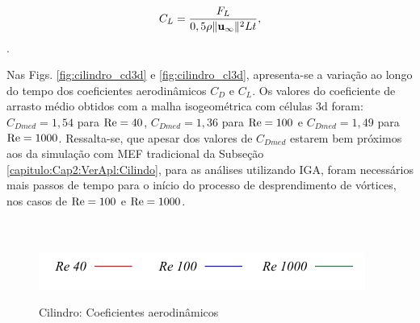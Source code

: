 \documentclass[tese_patricia]{subfiles}
\begin{document}
\begin{align}
	C_L = \frac{F_L}{0,5\rho \lVert \mathbf{u}_{\infty} \lVert^{2} L t},
\end{align}.


Nas Figs. \ref{fig:cilindro_cd3d} e \ref{fig:cilindro_cl3d}, apresenta-se a variação ao longo do tempo dos coeficientes aerodinâmicos $C_{D}$ e $C_{L}$. Os valores do coeficiente de arrasto médio obtidos com a malha isogeométrica com células 3d foram: $C_{Dmed} = 1,54$ para $\mathrm{Re} = 40$, $C_{Dmed} = 1,36$ para $\mathrm{Re} = 100$ e $C_{Dmed} = 1,49$ para $\mathrm{Re} = 1000$. Ressalta-se, que apesar dos valores de $C_{Dmed}$ estarem bem próximos aos da simulação com MEF tradicional da Subseção \ref{capitulo:Cap2:VerApl:Cilindo}, para as análises utilizando IGA, foram necessários mais passos de tempo para o início do processo de desprendimento de vórtices, nos casos de $\mathrm{Re} = 100$ e $\mathrm{Re} = 1000$. 

\begin{figure}[!htb]
	\centering
	  \\
	\\ 
	{\includegraphics[scale=1.3]{Imagens/Cap3/Legenda.pdf}}
	\caption{Cilindro: Coeficientes aerodinâmicos }
	\label{fig:cilindro_coeficientes3d}
\end{figure}
\end{document}
